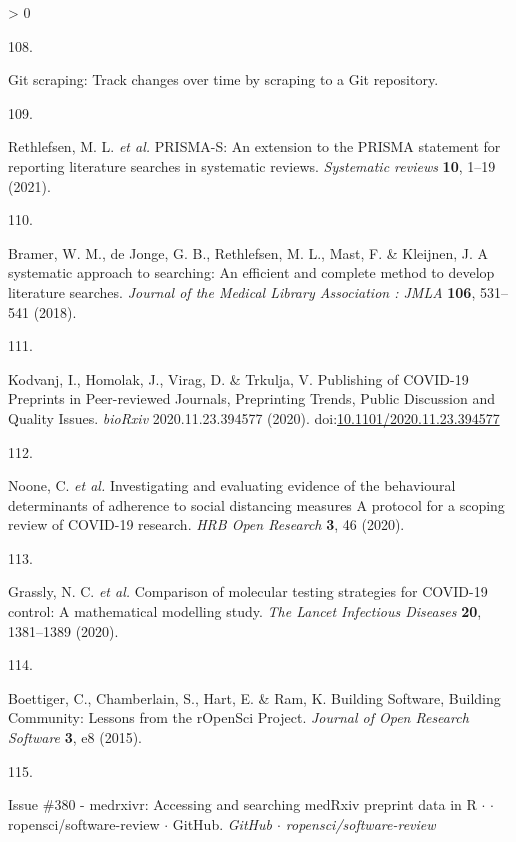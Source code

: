 \documentclass[a4paper, twoside]{templates/ociamthesis}
\newlength{\cslhangindent}
\newlength{\csllabelwidth}
\newenvironment{CSLReferences}[3] %
 {%
  \setlength{\parindent}{0pt}
  \ifodd #1 \everypar{\setlength{\hangindent}{\cslhangindent}}\ignorespaces\fi
  \ifnum #2 > 0
  \setlength{\parskip}{#2\baselineskip}
  \fi
 }%
 {}
\newcommand{\CSLLeftMargin}[1]{\parbox[t]{\maxof{\widthof{#1}}{\csllabelwidth}}{#1}}
\newcommand{\CSLRightInline}[1]{\parbox[t]{\linewidth - \csllabelwidth}{#1}}
\begin{document}
\begin{CSLReferences}{0}{0}
\leavevmode\hypertarget{ref-zotero-15031}{}%
\CSLLeftMargin{108. }
\CSLRightInline{Git scraping: Track changes over time by scraping to a {Git} repository.}

\leavevmode\hypertarget{ref-rethlefsen2021prisma}{}%
\CSLLeftMargin{109. }
\CSLRightInline{Rethlefsen, M. L. \emph{et al.} {PRISMA}-{S}: An extension to the {PRISMA} statement for reporting literature searches in systematic reviews. \emph{Systematic reviews} \textbf{10}, 1--19 (2021).}

\leavevmode\hypertarget{ref-bramer2018}{}%
\CSLLeftMargin{110. }
\CSLRightInline{Bramer, W. M., de Jonge, G. B., Rethlefsen, M. L., Mast, F. \& Kleijnen, J. A systematic approach to searching: An efficient and complete method to develop literature searches. \emph{Journal of the Medical Library Association : JMLA} \textbf{106}, 531--541 (2018).}

\leavevmode\hypertarget{ref-kodvanj2020}{}%
\CSLLeftMargin{111. }
\CSLRightInline{Kodvanj, I., Homolak, J., Virag, D. \& Trkulja, V. Publishing of {COVID}-19 {Preprints} in {Peer}-reviewed {Journals}, {Preprinting Trends}, {Public Discussion} and {Quality Issues}. \emph{bioRxiv} 2020.11.23.394577 (2020). doi:\href{https://doi.org/10.1101/2020.11.23.394577}{10.1101/2020.11.23.394577}}

\leavevmode\hypertarget{ref-noone2020}{}%
\CSLLeftMargin{112. }
\CSLRightInline{Noone, C. \emph{et al.} Investigating and evaluating evidence of the behavioural determinants of adherence to social distancing measures {} {A} protocol for a scoping review of {COVID}-19 research. \emph{HRB Open Research} \textbf{3}, 46 (2020).}

\leavevmode\hypertarget{ref-grassly2020}{}%
\CSLLeftMargin{113. }
\CSLRightInline{Grassly, N. C. \emph{et al.} Comparison of molecular testing strategies for {COVID}-19 control: A mathematical modelling study. \emph{The Lancet Infectious Diseases} \textbf{20}, 1381--1389 (2020).}

\leavevmode\hypertarget{ref-boettiger2015}{}%
\CSLLeftMargin{114. }
\CSLRightInline{Boettiger, C., Chamberlain, S., Hart, E. \& Ram, K. Building {Software}, {Building Community}: {Lessons} from the {rOpenSci Project}. \emph{Journal of Open Research Software} \textbf{3}, e8 (2015).}

\leavevmode\hypertarget{ref-zotero-15016}{}%
\CSLLeftMargin{115. }
\CSLRightInline{Issue \#380 - medrxivr: {Accessing} and searching {medRxiv} preprint data in {R} {\(\cdot\)} {\(\cdot\)} ropensci/software-review {\(\cdot\)} {GitHub}. \emph{GitHub {\(\cdot\)} ropensci/software-review}}


\end{CSLReferences}
\end{document}
